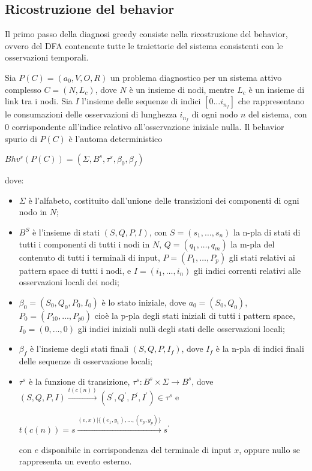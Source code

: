 \subsection{Ricostruzione del behavior}
Il primo passo della diagnosi greedy consiste nella ricostruzione del behavior, ovvero del DFA contenente tutte le traiettorie del sistema consistenti con le osservazioni temporali.
\begin{defn}
Sia $P(C) = (a_0,V,O,R)$ un problema diagnostico per un sistema attivo complesso $C = (N,L_c)$, dove $N$ è un insieme di nodi, mentre $L_c$ è un insieme di link tra i nodi. Sia $I$ l'insieme delle sequenze di indici $[0 \ldots i_{n_f}]$ che rappresentano le consumazioni delle osservazioni di lunghezza $i_{n_f}$ di ogni nodo $n$ del sistema, con $0$ corrispondente all'indice relativo all'osservazione iniziale nulla. 
Il behavior spurio di $P(C)$ è l'automa deterministico
\begin{center}
	$Bhv^s(P(C)) = (\Sigma,B^s,\tau^s,\beta_0,\beta_f)$
\end{center}
dove:
\begin{itemize}
\item $\Sigma$ è l'alfabeto, costituito dall'unione delle transizioni dei componenti di ogni nodo in $N$;
\item $B^S$ è l'insieme di stati $(S,Q,P,I)$, con $S = (s_1,\ldots,s_n)$ la n-pla di stati di tutti i componenti di tutti i nodi in $N$, $Q = (q_1,\ldots,q_m)$ la m-pla del contenuto di tutti i terminali di input, $P = (P_1,\ldots,P_p)$ gli stati relativi ai pattern space di tutti i nodi, e $I = (i_1, \ldots, i_n)$ gli indici correnti relativi alle osservazioni locali dei nodi;
\item $\beta_0 = (S_0,Q_0,P_0,I_0)$ è lo stato iniziale, dove $a_0 = (S_0,Q_0)$, $P_0 = (P_{10},\ldots,P_{p0})$ cioè la p-pla degli stati iniziali di tutti i pattern space, $I_0 = (0,\ldots,0)$ gli indici iniziali nulli degli stati delle osservazioni locali;
\item $\beta_f$ è l'insieme degli stati finali $(S,Q,P,I_f)$, dove $I_f$ è la n-pla di indici finali delle sequenze di osservazione locali;
\item $\tau^s$ è la funzione di transizione, $\tau^s: B^s \times \Sigma \rightarrow B^s$, dove $(S,Q,P,I) \xrightarrow{t(c(n))} (S^\prime,Q^\prime,P^\prime,I^\prime) \in \tau^s$ e 
\begin{center}
	$t(c(n)) = s \xrightarrow{(e,x) | \{(e_1,y_1), \ldots, (e_p,y_p)\}} s^\prime$
\end{center}
con $e$ disponibile in corrispondenza del terminale di input $x$, oppure nullo se rappresenta un evento esterno.

\end{itemize}
\end{defn}
